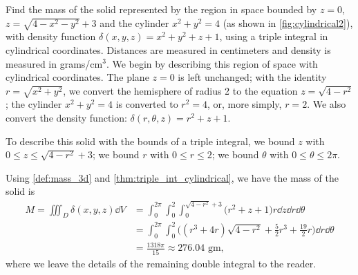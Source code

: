 \begin{example}\label{ex_cylindrical2}
Find the mass of the solid represented by the region in space bounded by $z=0$, $z=\sqrt{4-x^2-y^2}+3$ and the cylinder $x^2+y^2=4$ (as shown in \autoref{fig:cylindrical2}), with density function $\delta(x,y,z) = x^2+y^2+z+1$, using a triple integral in cylindrical coordinates. Distances are measured in centimeters and density is measured in grams/cm$^3$.
\solution
We begin by describing this region of space with cylindrical coordinates. The plane $z=0$ is left unchanged; with the identity $r=\sqrt{x^2+y^2}$, we convert the hemisphere of radius 2 to the equation $z=\sqrt{4-r^2}$; the cylinder $x^2+y^2=4$ is converted to $r^2=4$, or, more simply, $r=2$.  We also convert the density function: $\delta(r,\theta,z) = r^2+z+1$.

To describe this solid with the bounds of a triple integral, we bound $z$ with $0\leq z\leq \sqrt{4-r^2}+3$; we bound $r$ with $0 \leq r \leq 2$; we bound $\theta$ with $0 \leq \theta \leq 2\pi$.

Using \autoref{def:mass_3d} and \autoref{thm:triple_int_cylindrical}, we have the mass of the solid is
\begin{align*}
M=\iiint_D\delta(x,y,z)\dd V &= \int_0^{2\pi}\int_0^2\int_0^{\sqrt{4-r^2}+3}\bigl(r^2+z+1\bigr)r\dd z\dd r\dd\theta \\
&= \int_0^{2\pi}\int_0^2\bigl((r^3+4r)\sqrt{4-r^2}+\frac52r^3+\frac{19}2r\bigr)\dd r\dd\theta \\
&= \frac{1318\pi}{15} \approx 276.04\text{ gm},
\end{align*}
where we leave the details of the remaining double integral to the reader.
\end{example}

